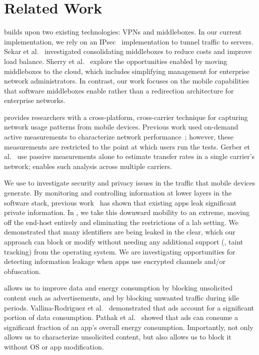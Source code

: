 \section{Related Work}
\label{sec:rw}
\meddle builds upon two existing technologies: VPNs and middleboxes. 
In our current implementation, we rely on an IPsec~\cite{rfc:ipsec} implementation 
to tunnel traffic to \meddle servers. Sekar et al.~\cite{sekar:middleboxes} investigated consolidating middleboxes 
to reduce costs and improve load balance. Sherry et al.~\cite{sherry:middleboxes} explore the opportunities 
enabled by moving middleboxes to the cloud, which includes simplifying management 
for enterprise network administrators. In contrast, our work focuses on the mobile capabilities 
that software middleboxes enable rather than a redirection architecture for enterprise networks. 

\meddle provides researchers with a cross-platform, cross-carrier technique 
for capturing network usage patterns from mobile devices. Previous work 
used on-demand active measurements to characterize network performance~\cite{wang:middleboxes,speedtest}; 
however, these measurements are restricted to the point at which users run 
the tests. Gerber et al.~\cite{gerber:passivespeed} use passive measurements alone 
to estimate transfer rates in a single carrier's network; \meddle 
enables such analysis across multiple carriers.

We use \meddle to investigate security and privacy issues in the 
traffic that mobile devices generate. By monitoring and controlling 
information at lower layers in the software stack, previous work~\cite{enck:taintdroid,hornyack:appfence,wsj:apps-watching-you} has shown 
that existing apps leak significant private information. In \meddle, we take 
this downward mobility to an extreme, moving off the end-host entirely and 
eliminating the restrictions of a lab setting. We demonstrated that  
many identifiers are being leaked in the clear, which our approach can 
block or modify without needing any additional support (\eg, taint tracking) 
from the operating system. We are investigating 
opportunities for detecting information leakage when apps use encrypted 
channels and/or obfuscation.

\meddle allows us to improve data and energy consumption by blocking 
unsolicited content such as advertisements, and by blocking unwanted 
traffic during idle periods. Vallina-Rodriguez et al.~\cite{vallina-rod:ads} demonstrated 
that ads account for a significant portion of data consumption. Pathak et al.~\cite{pathak:eprof} 
showed that ads can consume a significant fraction of an app's overall energy consumption. 
Importantly, \meddle not only allows us to characterize unsolicited content, but 
also allows us to block it without OS or app modification.

